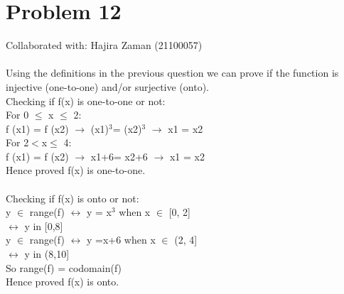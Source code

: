 \documentclass{article}
\begin{document}
\section{Problem 12}
Collaborated with: Hajira Zaman (21100057) \\ \\
Using the definitions in the previous question we can prove if the function is injective (one-to-one) and/or surjective (onto). \\
Checking if f(x) is one-to-one or not: \\ 
For 0 $\leq$ x $\leq$ 2:\\
f (x1) = f (x2) $\rightarrow$ (x1)$^{3}$= (x2)$^{3}$ $\rightarrow$ x1 = x2 \\
For 2$<$x$\leq$ 4:\\
f (x1) = f (x2) $\rightarrow$ x1+6= x2+6 $\rightarrow$ x1 = x2 \\ 
Hence proved f(x) is one-to-one.\\ \\
Checking if f(x) is onto or not: \\
y $\in$ range(f) $\leftrightarrow$ y = x$^{3}$ when x $\in$ [0, 2] \\ 
$\leftrightarrow$ y in [0,8] \\
y $\in$ range(f) $\leftrightarrow$ y =x+6 when x $\in$ (2, 4] \\ 
$\leftrightarrow$ y in (8,10] \\
So range(f) = codomain(f)\\
Hence proved f(x) is onto. \\
\end{document}
